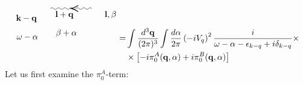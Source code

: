 \begin{equation}
\begin{aligned}
\begin{tikzpicture}[x=0.75pt,y=0.75pt,yscale=-1,xscale=1]
\draw    (156.92,125.11) .. controls (158.59,123.44) and (160.25,123.44) .. (161.92,125.11) .. controls (163.59,126.78) and (165.25,126.78) .. (166.92,125.11) .. controls (168.59,123.44) and (170.25,123.44) .. (171.92,125.11) .. controls (173.59,126.78) and (175.25,126.78) .. (176.92,125.11) .. controls (178.59,123.44) and (180.25,123.44) .. (181.92,125.11) .. controls (183.59,126.78) and (185.25,126.78) .. (186.92,125.11) .. controls (188.59,123.44) and (190.25,123.44) .. (191.92,125.11) .. controls (193.59,126.78) and (195.25,126.78) .. (196.92,125.11) .. controls (198.59,123.44) and (200.25,123.44) .. (201.92,125.11) .. controls (203.59,126.78) and (205.25,126.78) .. (206.92,125.11) .. controls (208.59,123.44) and (210.25,123.44) .. (211.92,125.11) .. controls (213.59,126.78) and (215.25,126.78) .. (216.92,125.11) .. controls (218.59,123.44) and (220.25,123.44) .. (221.92,125.11) -- (222.22,125.11) -- (222.22,125.11) ;
\draw [shift={(189.57,125.11)}, rotate = 0] [color={rgb, 255:red, 0; green, 0; blue, 0 }  ][line width=0.75]    (10.93,-4.9) .. controls (6.95,-2.3) and (3.31,-0.67) .. (0,0) .. controls (3.31,0.67) and (6.95,2.3) .. (10.93,4.9)   ;

\draw (101,134) node [anchor=north west][inner sep=0.75pt]    {$\mathbf{k-q}$};
\draw (241,128) node [anchor=north west][inner sep=0.75pt]    {$\mathbf{l} ,\beta $};
\draw (163,128) node [anchor=north west][inner sep=0.75pt]    {$\mathbf{l} +\mathbf{q}$};
\draw (163.96,157.08) node [anchor=north west][inner sep=0.75pt]    {$\beta +\alpha $};
\draw (101.96,165.08) node [anchor=north west][inner sep=0.75pt]    {$\omega -\alpha $};


\end{tikzpicture}=&\int \frac{d^{3} \mathbf{q}}{(2 \pi)^{3}} \int \frac{d \alpha}{2 \pi}\left(-i V_{q}\right)^{2} \frac{i}{\omega-\alpha-\epsilon_{k-q}+i \delta_{k-q}}\times\\
&\times\left[-i \pi_{0}^{A}(\mathbf{q}, \alpha)+i \pi_{0}^{B}(\mathbf{q}, \alpha)\right]
    \end{aligned}
\end{equation}
Let us first examine the $\pi^A_0$-term:
